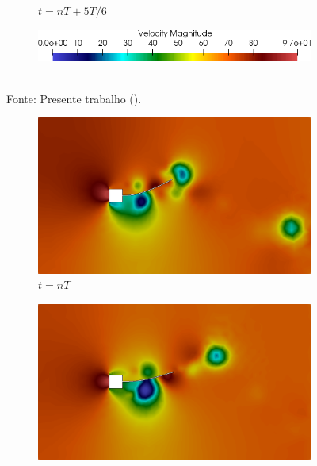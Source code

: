 \begin{figure}[h!]
\begin{subfigure}[b]{0.32\textwidth}
        \caption{$t=nT+5T/6$}
    \end{subfigure}
    \begin{subfigure}[b]{0.49\textwidth}
        \includegraphics[width=\linewidth]{Figuras/FSI-prism2/vLegenda.png}
    \end{subfigure}
    \\Fonte: Presente trabalho (\the\year).
    \label{fig:prismVel2}
\end{figure}

\begin{figure}[h!]
    \centering
    \caption{\textit{Flutter} em painel - Campo de pressão obtidos no problema de \textit{Flutter} em painel.}
    \begin{subfigure}[b]{0.32\textwidth}
        \includegraphics[width=\linewidth]{Figuras/FSI-prism2/pT1.png}
        \caption{$t=nT$}
    \end{subfigure}
    \begin{subfigure}[b]{0.32\textwidth}
        \includegraphics[width=\linewidth]{Figuras/FSI-prism2/pT2.png}

\end{subfigure}
\end{figure}
